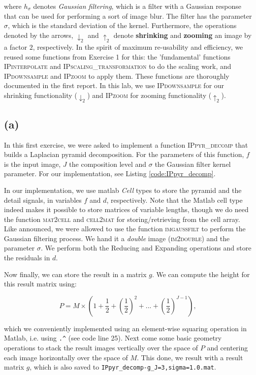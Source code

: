 \documentclass{article}
\begin{document}
where $h_\sigma$ denotes \textit{Gaussian filtering}, which is a filter with a Gaussian response that can be used for performing a sort of image blur. The filter has the parameter $\sigma$, which is the standard deviation of the kernel. Furthermore, the operations denoted by the arrows, $\downarrow_2$ and $\uparrow_2$ denote \textbf{shrinking} and \textbf{zooming} an image by a factor $2$, respectively. In the spirit of maximum re-usability and efficiency, we reused some functions from Exercise 1 for this: the 'fundamental' functions \textsc{IPinterpolate} and \textsc{IPscaling\_transformation} to do the scaling work, and \textsc{IPdownsample} and \textsc{IPzoom} to apply them. These functions are thoroughly documented in the first report. In this lab, we use \textsc{IPdownsample} for our shrinking functionality ($\downarrow_2$) and \textsc{IPzoom} for zooming functionality ($\uparrow_2$).

\subsection*{(a)} In this first exercise, we were asked to implement a function \textsc{IPpyr\_decomp} that builds a Laplacian pyramid decomposition. For the parameters of this function, $f$ is the input image, $J$ the composition level and $\sigma$ the Gaussian filter kernel parameter. For our implementation, see  Listing \ref{code:IPpyr_decomp}.

In our implementation, we use matlab \textit{Cell} types to store the pyramid and the detail signals, in variables $f$ and $d$, respectively. Note that the Matlab cell type indeed makes it possible to store matrices of variable lengths, though we do need the function \textsc{mat2cell} and \textsc{cell2mat} for storing/retrieving from the cell array. Like announced, we were allowed to use the function \textsc{imgaussfilt} to perform the Gaussian filtering process. We hand it a \textit{double} image (\textsc{im2double}) and the parameter $\sigma$. We perform both the Reducing and Expanding operations and store the residuals in $d$.

Now finally, we can store the result in a matrix $g$. We can compute the height for this result matrix using:


\[
    P = M \times (1+\frac{1}{2}+(\frac{1}{2})^2+...+(\frac{1}{2})^{J-1}),
\]

which we conveniently implemented using an element-wise squaring operation in Matlab, i.e. using \texttt{.\^} (see code line 25). Next come some basic geometry operations to stack the result images vertically over the space of $P$ and centering each image horizontally over the space of $M$. This done, we result with a result matrix $g$, which  is also saved to \texttt{IPpyr\_decomp-g\_J=3,sigma=1.0.mat}.
\end{document}
